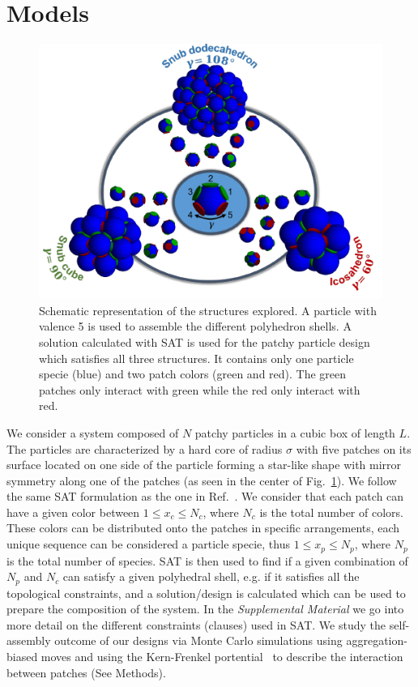 \documentclass[a4paper, amsfonts, amssymb, amsmath, reprint, showkeys, nofootinbib, oneside]{revtex4-1}
\begin{document}
\section{Models}


\begin{figure}[t]
	\includegraphics{fig1.pdf}
	\caption{\label{SAT} Schematic representation of the structures explored. A particle with valence 5 is used to assemble the different polyhedron shells. A solution calculated with SAT is used for the patchy particle design which satisfies all three structures. It contains only one particle specie (blue) and two patch colors (green and red). The green patches only interact with green while the red only interact with red.}
\end{figure}

We consider a system composed of $N$ patchy particles in a cubic box of length $L$. The particles are characterized by a hard core of radius $\sigma$ with five patches on its surface located on one side of the particle forming a star-like shape with mirror symmetry along one of the patches (as seen in the center of Fig.~\ref{SAT}).
We follow the same SAT formulation as the one in Ref.~\cite{Russo2022}. We consider that each patch can have a given color between $1\leq x_c\leq N_c$, where $N_c$ is the total number of colors. These colors can be distributed onto the patches in specific arrangements, each unique sequence can be considered a particle specie, thus $1\leq x_p\leq N_p$, where $N_p$ is the total number of species. SAT is then used to find if a given combination of $N_p$ and $N_c$ can satisfy a given polyhedral shell, e.g. if it satisfies all the topological constraints, and a solution/design is calculated which can be used to prepare the composition of the system. In the \emph{Supplemental Material} we go into more detail on the different constraints (clauses) used in SAT.
We study the self-assembly outcome of our designs via Monte Carlo simulations using aggregation-biased moves and using the Kern-Frenkel portential~\cite{Kern2003} to describe the interaction between patches (See Methods).
\end{document}
